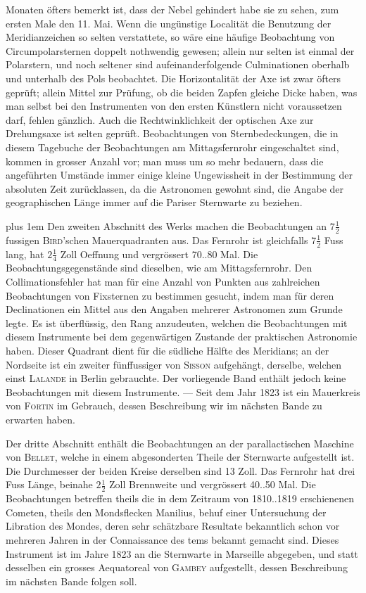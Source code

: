 Monaten öfters bemerkt ist, dass der Nebel gehindert habe sie zu sehen, zum ersten Male den 11. Mai. Wenn die ungünstige Localität die Benutzung der Meridianzeichen so selten verstattete, so wäre eine häufige Beobachtung von Circumpolarsternen doppelt nothwendig gewesen; allein nur selten ist einmal der Polarstern, und noch seltener sind aufeinanderfolgende Culminationen oberhalb und unterhalb des Pols beobachtet. Die Horizontalität der Axe ist zwar öfters geprüft; allein Mittel zur Prüfung, ob die beiden Zapfen gleiche Dicke haben, was man selbst bei den Instrumenten von den ersten Künstlern nicht voraussetzen darf, fehlen gänzlich. Auch die Rechtwinklichkeit der optischen Axe zur Drehungsaxe ist selten geprüft. Beobachtungen von Sternbedeckungen, die in diesem Tagebuche der Beobachtungen am Mittagsfernrohr eingeschaltet sind, kommen in grosser Anzahl vor; man muss um so mehr bedauern, dass die angeführten Umstände immer einige kleine Ungewissheit in der Bestimmung der absoluten Zeit zurücklassen, da die Astronomen gewohnt sind, die Angabe der geographischen Länge immer auf die Pariser Sternwarte zu beziehen.

\begingroup\rightskip=0pt plus 1em Den zweiten Abschnitt des Werks machen die Beobachtungen an $7\frac{1}{2}$fussigen \textsc{Bird}'schen Mauerquadranten aus. Das Fernrohr ist gleichfalls $7\frac{1}{2}$ Fuss lang, hat $2\frac{1}{4}$ Zoll Oeffnung und vergrössert 70..80 Mal. Die Beobachtungsgegenstände sind dieselben, wie am Mittagsfernrohr. Den Collimationsfehler hat man für eine Anzahl von Punkten aus zahlreichen Beobachtungen von Fixsternen zu bestimmen gesucht, indem man für deren Declinationen ein Mittel aus den Angaben mehrerer Astronomen zum Grunde legte. Es ist überflüssig, den Rang anzudeuten, welchen die Beobachtungen mit diesem Instrumente bei dem gegenwärtigen Zustande der praktischen Astronomie haben. Dieser Quadrant dient für die südliche Hälfte des Meridians; an der Nordseite ist ein zweiter fünffussiger von \textsc{Sisson} aufgehängt, derselbe, welchen einst \textsc{Lalande} in Berlin gebrauchte. Der vorliegende Band enthält jedoch keine Beobachtungen mit diesem Instrumente. --- Seit dem Jahr 1823 ist ein Mauerkreis von \textsc{Fortin} im Gebrauch, dessen Beschreibung wir im nächsten Bande zu erwarten haben.\par\endgroup

Der dritte Abschnitt enthält die Beobachtungen an der parallactischen Maschine von \textsc{Bellet}, welche in einem abgesonderten Theile der Sternwarte aufgestellt ist. Die Durchmesser der beiden Kreise derselben sind 13 Zoll. Das Fernrohr hat drei Fuss Länge, beinahe $2\frac{1}{2}$ Zoll Brennweite und vergrössert 40..50 Mal. Die Beobachtungen betreffen theils die in dem Zeitraum von 1810..1819 erschienenen Cometen, theils den Mondsflecken Manilius, behuf einer Untersuchung der Libration des Mondes, deren sehr schätzbare Resultate bekanntlich schon vor mehreren Jahren in der Connaissance des tems bekannt gemacht sind. Dieses Instrument ist im Jahre 1823 an die Sternwarte in Marseille abgegeben, und statt desselben ein grosses Aequatoreal von \textsc{Gambey} aufgestellt, dessen Beschreibung im nächsten Bande folgen soll.
